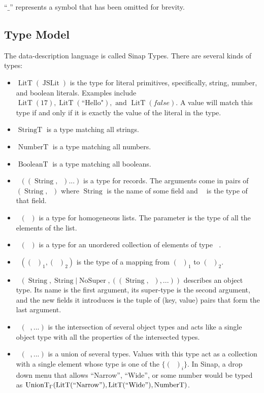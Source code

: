 \documentclass{article}
\DeclareMathOperator{\StringT}{StringT}
\DeclareMathOperator{\NumberT}{NumberT}
\DeclareMathOperator{\BooleanT}{BooleanT}
\DeclareMathOperator{\LitT}{LitT}
\DeclareMathOperator{\JSLit}{JSLit}
\DeclareMathOperator{\RecT}{RecT_\Gamma}
\DeclareMathOperator{\ObjT}{ObjT_\Gamma}
\DeclareMathOperator{\ListT}{ListT_\Gamma}
\DeclareMathOperator{\SetT}{SetT_\Gamma}
\DeclareMathOperator{\MapT}{MapT_\Gamma}
\DeclareMathOperator{\UnionT}{UnionT_\Gamma}
\DeclareMathOperator{\InterT}{InterT_\Gamma}
\DeclareMathOperator{\String}{String}
\DeclareMathOperator{\Type}{{Type_\Gamma}}
\DeclareMathOperator{\NoSuper}{NoSuper}
\begin{document}
``\(\_\)'' represents a symbol that has been omitted for brevity.

\subsection{Type Model}
The data-description language is called Sinap Types. There are 
several kinds of types:

\begin{itemize}
    \item \(\LitT(\JSLit)\) is the type for literal primitives, specifically,
    string, number, and boolean literals. 
    Examples include \(\LitT(17), \LitT(\text{``Hello"}), \text{ and } 
    \LitT(false)\). A value will match this type if and only if it is
    exactly the value of the literal in the type. 
    \item \(\StringT\) is a type matching all strings.
    \item \(\NumberT\) is a type matching all numbers.
    \item \(\BooleanT\) is a type matching all booleans.
    \item \(\RecT((\String, \Type)...)\) is a type for records. 
    The arguments come in pairs of \((\String, \Type)\) where
    \(\String\) is the name of some field and \(\Type\) is the
    type of that field.
    \item \(\ListT(\Type)\) is a type for homogeneous lists. The
    parameter is the type of all the elements of the list. 
    \item \(\SetT(\Type)\) is a type for an unordered collection
    of elements of type \(\Type\).
    \item \(\MapT((\Type)_1, (\Type)_2)\) is the type of a mapping from 
    \((\Type)_1\) to \((\Type)_2\).
    \item \(\ObjT(\String, \String | \NoSuper, ((\String, \Type), ...))\)
    describes an object type. Its name is the first argument, 
    its super-type is the second argument, and the new fields 
    it introduces is the tuple of (key, value) pairs that form the
    last argument. 
    \item \(\InterT(\ObjT,  ...)\) is the intersection of several 
    object types and acts like a single object type with all the 
    properties of the intersected types. 
    \item \(\UnionT(\Type, ...)\) is a union of several types. 
    Values with this type act as a collection with a single element
    whose type is one of the \(\{(\Type)_i\}\). In Sinap, a drop down 
    menu that allows ``Narrow'', ``Wide'', or some number would be 
    typed as \(\UnionT(\LitT(``\text{Narrow}"), \LitT(``\text{Wide}"),
     \NumberT)\).
\end{itemize}
\end{document}
